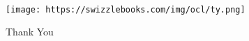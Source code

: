 \documentclass[11pt]{article}
\makeatletter
\def\maxwidth{\ifdim\Gin@nat@width>\linewidth\linewidth
    \else\Gin@nat@width\fi}
\let\Oldincludegraphics\includegraphics
\renewcommand{\includegraphics}[1]{\Oldincludegraphics[width=.8\maxwidth]{#1}}
\makeatother
\begin{document}
    \begin{center}
    \end{center}
    { \hspace*{\fill} \\}
    
    \begin{figure}[htbp]
\centering
\texttt{[image: https://swizzlebooks.com/img/ocl/ty.png]}
\caption{Thank You}
\end{figure}


    
    
    
    
\end{document}
